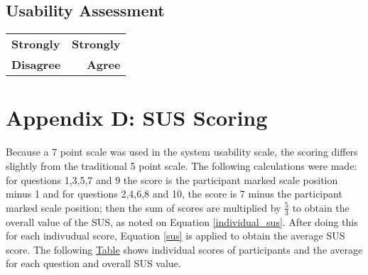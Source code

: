 \subsection*{Usability Assessment}

\hspace*{0.47\textwidth}%
\begin{tabularx}{0.5\textwidth}{@{}LR@{}}
    \textbf{Strongly} & \textbf{Strongly} \\
    \textbf{Disagree} & \textbf{Agree} \\
\end{tabularx}

\begin{enumerate}









\end{enumerate}

\clearpage

\section*{Appendix D: SUS Scoring}\label{appendix:sus}

Because a 7 point scale was used in the system usability scale, the scoring
differs slightly from the traditional 5 point scale. The following calculations were made:
for questions 1,3,5,7 and 9 the score is the participant marked scale position minus 1 and
for questions 2,4,6,8 and 10, the score is 7 minus the participant marked scale position;
then the sum of scores are multiplied by $\frac{5}{3}$ to obtain the overall value of the SUS,
as noted on Equation \ref{individual_sus}. After doing this for each indivudual score,
Equation \ref{sus} is applied to obtain the average SUS score. The following
\hyperref[table:sus_scoring]{Table} shows individual scores of participants and the average for
each question and overall SUS value.

